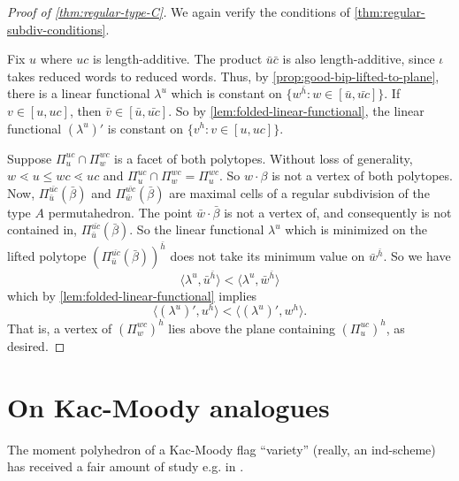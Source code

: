 \documentclass[11pt]{amsart}
\theoremstyle{definition}
\def\pt{\beta}
\begin{document}
 \begin{proof}[Proof of \cref{thm:regular-type-C}]
 	We again verify the conditions of \cref{thm:regular-subdiv-conditions}.
 	
 	 	Fix $u$ where $uc$ is length-additive. The product $\bar{u} \bar{c}$ is also length-additive, since $\iota$ takes reduced words to reduced words. Thus, by \cref{prop:good-bip-lifted-to-plane}, there is a linear functional $\lambda^u$ which is constant on $\{w^{\bar{h}}: w \in [\bar{u}, \bar{uc}]\}$. If $v \in [u,uc]$, then $\bar{v} \in [\bar{u}, \bar{uc}]$. So by \cref{lem:folded-linear-functional}, the linear functional $(\lambda^u)'$ is constant on $\{v^h: v \in [u,uc]\}$.
 	
 	 Suppose $\Pi_u^{uc} \cap \Pi_w^{wc}$ is a facet of both polytopes. Without loss of generality, $w \lessdot u \leq wc \lessdot uc$ and $\Pi_u^{uc} \cap \Pi_w^{wc} = \Pi_u^{wc}$. So $w \cdot \pt$ is not a vertex of both polytopes. Now, $\Pi_{\bar{u}}^{\bar{uc}}(\bar{\pt})$ and $\Pi_{\bar{w}}^{\bar{wc}}(\bar{\pt})$ are maximal cells of a regular subdivision of the type $A$ permutahedron. The point $\bar{w} \cdot \bar{\pt}$ is not a vertex of, and consequently is not contained in, $\Pi_{\bar{u}}^{\bar{uc}}(\bar{\pt})$. So the linear functional $\lambda^u$ which is minimized on the lifted polytope  $(\Pi_{\bar{u}}^{\overline{uc}}(\bar{\pt}))^{\bar{h}}$ does not take its minimum value on $\bar{w}^{\bar{h}}$. So we have
 	\[\langle \lambda^u, \bar{u}^{\bar{h}} \rangle < \langle  \lambda^u, \bar{w}^{\bar{h}} \rangle\]
 	which by \cref{lem:folded-linear-functional} implies 
 		\[\langle (\lambda^u)', {u}^{{h}} \rangle < \langle  (\lambda^u)', {w}^{{h}} \rangle.\]
 		That is, a vertex of $(\Pi_w^{wc})^h$ lies above the plane containing $(\Pi_u^{uc})^h$, as desired.
 \end{proof}
 










\section{On Kac-Moody analogues}

The moment polyhedron of a Kac-Moody flag ``variety'' (really, an ind-scheme)
has received a fair amount of study e.g.
in \cite{Yun,HHH,BaumannKamnitzerTingley}.
\end{document}
